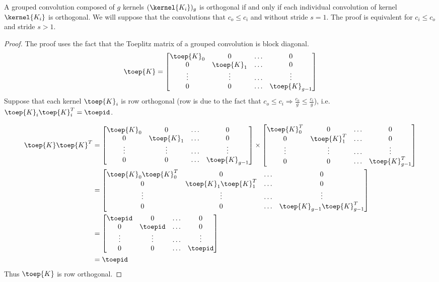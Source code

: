 A grouped convolution composed of $g$ kernels $(\kernel{K_i})_g$ is orthogonal if and only if each individual convolution of kernel $\kernel{K_i}$ is orthogonal.
We will suppose that the convolutions that $c_o\leq c_i$ and without stride $s=1$. The proof is equivalent for $c_i\leq c_o$ and stride $s>1$.
\begin{proof}
    The proof uses the fact that the Toeplitz matrix of a grouped convolution is block diagonal. 
    \[
    \toep{K} = \begin{bmatrix}
    \toep{K}_0 & 0 & \hdots & 0 \\
    0 & \toep{K}_1 &  \hdots & 0 \\
    
    \vdots & \vdots & \hdots & \vdots \\
    0 & 0 & \hdots & \toep{K}_{g-1} \\
    
    \end{bmatrix}
    \]
    Suppose that each kernel $\toep{K}_i$ is  row orthogonal (row is due to the fact that  $c_o \leq c_i \Rightarrow \frac{c_o}{g}\leq \frac{c_i}{g}$), i.e. $\toep{K}_i\toep{K}_i^T=\toepid$. 
    
\begin{align*}
\toep{K}\toep{K}^T &= \begin{bmatrix}
    \toep{K}_0 & 0 & \hdots & 0 \\
    0 & \toep{K}_1 &  \hdots & 0 \\
    \vdots & \vdots & \hdots & \vdots \\
    0 & 0 & \hdots & \toep{K}_{g-1} 
    \end{bmatrix} \times \begin{bmatrix}
    \toep{K}_0^T & 0 & \hdots & 0 \\
    0 & \toep{K}_1^T &  \hdots & 0 \\
    \vdots & \vdots & \hdots & \vdots \\
    0 & 0 & \hdots & \toep{K}_{g-1}^T
    \end{bmatrix} \\
    & = \begin{bmatrix}
    \toep{K}_0\toep{K}_0^T & 0 & \hdots & 0 \\
    0 & \toep{K}_1\toep{K}_1^T &  \hdots & 0 \\
    \vdots & \vdots & \hdots & \vdots \\
    0 & 0 & \hdots & \toep{K}_{g-1}\toep{K}_{g-1}^T
    \end{bmatrix} \\
    & = \begin{bmatrix}
    \toepid & 0 & \hdots & 0 \\
    0 & \toepid &  \hdots & 0 \\
    \vdots & \vdots & \hdots & \vdots \\
    0 & 0 & \hdots & \toepid
    \end{bmatrix} \\
    &= \toepid
\end{align*}
    Thus $\toep{K}$ is row orthogonal.
    

\end{proof}
